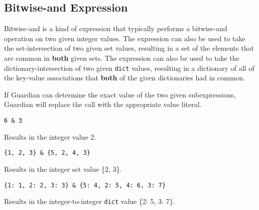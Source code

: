 
\subsection{Bitwise-and Expression}
{
	Bitwise-and is a kind of expression that typically performs
	a bitwise-and operation on two given integer values.
	The expression can also be used to take the set-intersection of two given
	set values, resulting in a set of the elements that are
	common in \textbf{both}
	given sets.
	The expression can also be used to take the
	dictionary-intersection of two given
	\texttt{dict} values, resulting in a dictionary of all of the key-value
	associations that \textbf{both} of the given dictionaries had in common.
	
	If Guardian can determine the exact value of the two given subexpressions,
	Guardian will replace the call with the appropriate value literal.
	
	\begin{itemize}
	{
		\item[] \texttt{6 \& 3}
		
			Results in the integer value 2.
		
		\item[] \texttt{\{1, 2, 3\} \& \{5, 2, 4, 3\}}
		
			Results in the integer set value \{2, 3\}.
		
		\item[] \texttt{\{1: 1, 2: 2, 3: 3\} \& \{5: 4, 2: 5, 4: 6, 3: 7\}}
		
			Results in the integer-to-integer \texttt{dict} value \{2: 5, 3: 7\}.
	}
	\end{itemize}
}
